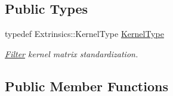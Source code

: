 \subsection*{Public Types}
\begin{DoxyCompactItemize}
\item 
typedef Extrinsics\-::\-Kernel\-Type \hyperlink{structffnn_1_1layer_1_1convolution_1_1_filter_ad5cce121107613f7bfd80ff7df649b96}{Kernel\-Type}
\begin{DoxyCompactList}\small\item\em \hyperlink{structffnn_1_1layer_1_1convolution_1_1_filter}{Filter} kernel matrix standardization. \end{DoxyCompactList}\end{DoxyCompactItemize}
\subsection*{Public Member Functions}
